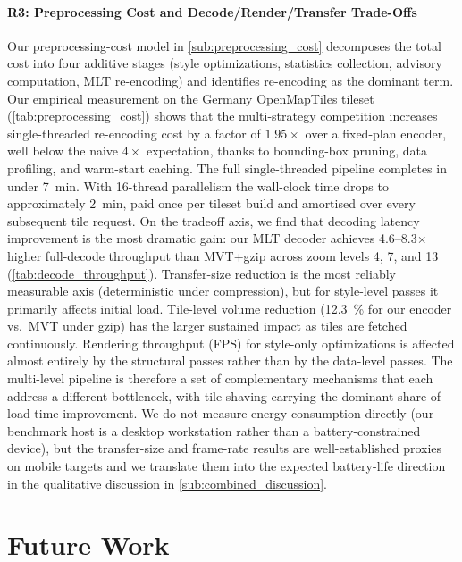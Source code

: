 \paragraph{R3: Preprocessing Cost and Decode/Render/Transfer Trade-Offs}
Our preprocessing-cost model in \cref{sub:preprocessing_cost} decomposes the total cost into four additive stages (style optimizations, statistics collection, advisory computation, \ac{MLT} re-encoding) and identifies re-encoding as the dominant term.
Our empirical measurement on the Germany OpenMapTiles tileset (\cref{tab:preprocessing_cost}) shows that the multi-strategy competition increases single-threaded re-encoding cost by a factor of $1.95\times$ over a fixed-plan encoder, well below the naive $4\times$ expectation, thanks to bounding-box pruning, data profiling, and warm-start caching.
The full single-threaded pipeline completes in under \qty{7}{\minute}.
With 16-thread parallelism the wall-clock time drops to approximately \qty{2}{\minute}, paid once per tileset build and amortised over every subsequent tile request.
On the tradeoff axis, we find that decoding latency improvement is the most dramatic gain: our \ac{MLT} decoder achieves \numrange{4.6}{8.3}$\times$ higher full-decode throughput than \ac{MVT}+gzip across zoom levels 4, 7, and 13 (\cref{tab:decode_throughput}).
Transfer-size reduction is the most reliably measurable axis (deterministic under compression), but for style-level passes it primarily affects initial load.
Tile-level volume reduction (\qty{12.3}{\percent} for our encoder vs.\ \ac{MVT} under gzip) has the larger sustained impact as tiles are fetched continuously.
Rendering throughput (\ac{FPS}) for style-only optimizations is affected almost entirely by the structural passes rather than by the data-level passes.
The multi-level pipeline is therefore a set of complementary mechanisms that each address a different bottleneck, with tile shaving carrying the dominant share of load-time improvement.
We do not measure energy consumption directly (our benchmark host is a desktop workstation rather than a battery-constrained device), but the transfer-size and frame-rate results are well-established proxies on mobile targets and we translate them into the expected battery-life direction in the qualitative discussion in \cref{sub:combined_discussion}.

\section{Future Work}\label{sec:conclusion_future_work}

